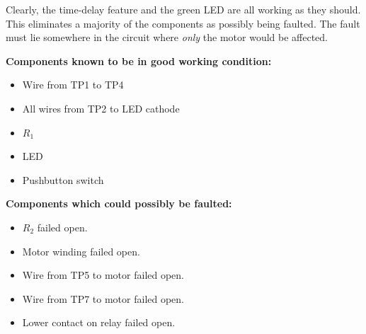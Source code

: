 
Clearly, the time-delay feature and the green LED are all working as they should.  This eliminates a majority of the components as possibly being faulted.  The fault must lie somewhere in the circuit where {\it only} the motor would be affected.

\vskip 10pt

\goodbreak
\noindent
{\bf Components known to be in good working condition:}

\begin{itemize}
\item{} Wire from TP1 to TP4
\item{} All wires from TP2 to LED cathode
\item{} $R_1$
\item{} LED
\item{} Pushbutton switch
\end{itemize}

\vskip 10pt

\goodbreak
\noindent
{\bf Components which could possibly be faulted:}

\begin{itemize}
\item{} $R_2$ failed open.
\item{} Motor winding failed open.
\item{} Wire from TP5 to motor failed open.
\item{} Wire from TP7 to motor failed open.
\item{} Lower contact on relay failed open.
\end{itemize}




